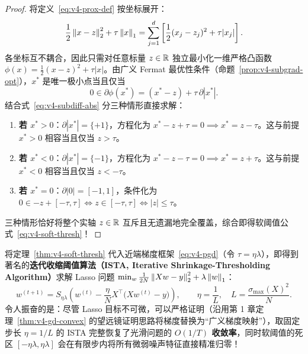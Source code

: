 \begin{proof}
将定义~\eqref{eq:v4-prox-def} 按坐标展开：
\[
  \frac{1}{2}\left\|x - z\right\|_2^2 + \tau \left\|x\right\|_1 = \sum_{j=1}^d \left[\frac{1}{2}(x_j - z_j)^2 + \tau |x_j|\right].
\]
各坐标互不耦合，因此只需对任意标量 $z \in \mathbb{R}$ 独立最小化一维严格凸函数 $\phi(x) = \frac{1}{2}(x - z)^2 + \tau|x|$。由广义 Fermat 最优性条件（命题~\ref{prop:v4-subgrad-opt}），$x^*$ 是唯一极小点当且仅当
\[
  0 \in \partial \phi(x^*) = (x^* - z) + \tau\,\partial |x^*|.
\]
结合式~\eqref{eq:v4-subdiff-abs} 分三种情形直接求解：
\begin{enumerate}
  \item \textbf{若 $x^* > 0$}：$\partial |x^*| = \{+1\}$，方程化为 $x^* - z + \tau = 0 \implies x^* = z - \tau$。这与前提 $x^* > 0$ 相容当且仅当 $z > \tau$。
  \item \textbf{若 $x^* < 0$}：$\partial |x^*| = \{-1\}$，方程化为 $x^* - z - \tau = 0 \implies x^* = z + \tau$。这与前提 $x^* < 0$ 相容当且仅当 $z < -\tau$。
  \item \textbf{若 $x^* = 0$}：$\partial |0| = [-1, 1]$，条件化为 $0 \in -z + [-\tau, \tau] \iff z \in [-\tau, \tau] \iff |z| \le \tau$。
\end{enumerate}
三种情形恰好将整个实轴 $z \in \mathbb{R}$ 互斥且无遗漏地完全覆盖，综合即得软阈值公式~\eqref{eq:v4-soft-thresh}！
\end{proof}

将定理~\ref{thm:v4-soft-thresh} 代入近端梯度框架~\eqref{eq:v4-pgd}（令 $\tau = \eta\lambda$），即得到著名的\textbf{迭代收缩阈值算法（ISTA, Iterative Shrinkage-Thresholding Algorithm）}求解 Lasso 问题 $\min_w \frac{1}{2N}\left\|Xw - y\right\|_2^2 + \lambda\left\|w\right\|_1$：
\begin{equation}\label{eq:v4-ista}
  w^{(t+1)} = S_{\eta\lambda}\!\left(w^{(t)} - \frac{\eta}{N}X^\top\big(Xw^{(t)} - y\big)\right), \qquad \eta = \frac{1}{L},\quad L = \frac{\sigma_{\max}(X)^2}{N}.
\end{equation}
令人振奋的是：尽管 Lasso 目标不可微，可以严格证明（沿用第 1 章定理~\ref{thm:v4-gd-convex} 的望远镜证明思路将梯度替换为“广义梯度映射”），取固定步长 $\eta = 1/L$ 的 ISTA 完整恢复了光滑问题的 \textbf{$O(1/T)$ 收敛率}，同时软阈值的死区 $[-\eta\lambda, \eta\lambda]$ 会在有限步内将所有微弱噪声特征直接精准归零！

